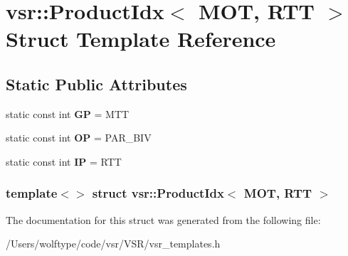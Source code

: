 \hypertarget{structvsr_1_1_product_idx_3_01_m_o_t_00_01_r_t_t_01_4}{\section{vsr\-:\-:Product\-Idx$<$ M\-O\-T, R\-T\-T $>$ Struct Template Reference}
\label{structvsr_1_1_product_idx_3_01_m_o_t_00_01_r_t_t_01_4}
}
\subsection*{Static Public Attributes}
\begin{DoxyCompactItemize}
\item 
\hypertarget{structvsr_1_1_product_idx_3_01_m_o_t_00_01_r_t_t_01_4_ad5b66aedb6d67f691b5df5576b73e69d}{static const int {\bfseries G\-P} = M\-T\-T}\label{structvsr_1_1_product_idx_3_01_m_o_t_00_01_r_t_t_01_4_ad5b66aedb6d67f691b5df5576b73e69d}

\item 
\hypertarget{structvsr_1_1_product_idx_3_01_m_o_t_00_01_r_t_t_01_4_ae1a9389f1e66bb6ed1b38875e89c4c9b}{static const int {\bfseries O\-P} = P\-A\-R\-\_\-\-B\-I\-V}\label{structvsr_1_1_product_idx_3_01_m_o_t_00_01_r_t_t_01_4_ae1a9389f1e66bb6ed1b38875e89c4c9b}

\item 
\hypertarget{structvsr_1_1_product_idx_3_01_m_o_t_00_01_r_t_t_01_4_a86a7648a2b91dee3e86cae70639e9c81}{static const int {\bfseries I\-P} = R\-T\-T}\label{structvsr_1_1_product_idx_3_01_m_o_t_00_01_r_t_t_01_4_a86a7648a2b91dee3e86cae70639e9c81}

\end{DoxyCompactItemize}
\subsubsection*{template$<$$>$ struct vsr\-::\-Product\-Idx$<$ M\-O\-T, R\-T\-T $>$}



The documentation for this struct was generated from the following file\-:\begin{DoxyCompactItemize}
\item 
/\-Users/wolftype/code/vsr/\-V\-S\-R/vsr\-\_\-templates.\-h\end{DoxyCompactItemize}
